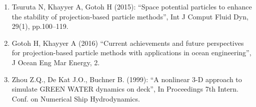 \begin{enumerate}
	\item Tsuruta N, Khayyer A, Gotoh H (2015): ``Space potential particles to enhance the stability of projection-based particle methods'', Int J Comput Fluid Dyn, 29(1), pp.100–119. \label{ref:Tsuruta2015}
	\item Gotoh H, Khayyer A (2016) ``Current achievements and future perspectives for projection-based particle methods with applications in ocean engineering'',  J Ocean Eng Mar Energy, 2. \label{ref:gotoh2016}
	\item Zhou Z.Q., De Kat J.O., Buchner B. (1999): ``A nonlinear 3-D approach to simulate GREEN WATER dynamics on deck'', In Proceedings 7th Intern. Conf. on Numerical Ship Hydrodynamics. \label{ref:zhou1999}
\end{enumerate}
